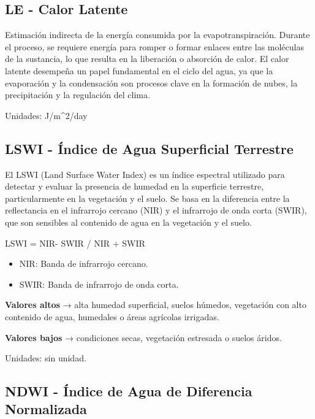 \documentclass[
]{book}
\begin{document}
\subsection{\texorpdfstring{\textbf{LE} - Calor Latente}{LE - Calor Latente}}\label{le---calor-latente-1}

Estimación indirecta de la energía consumida por la evapotranspiración. Durante el proceso, se requiere energía para romper o formar enlaces entre las moléculas de la sustancia, lo que resulta en la liberación o absorción de calor. El calor latente desempeña un papel fundamental en el ciclo del agua, ya que la evaporación y la condensación son procesos clave en la formación de nubes, la precipitación y la regulación del clima.

Unidades: J/m\^{}2/day

\subsection{\texorpdfstring{\textbf{LSWI} - Índice de Agua Superficial Terrestre}{LSWI - Índice de Agua Superficial Terrestre}}\label{lswi---uxedndice-de-agua-superficial-terrestre-1}

El LSWI (Land Surface Water Index) es un índice espectral utilizado para detectar y evaluar la presencia de humedad en la superficie terrestre, particularmente en la vegetación y el suelo. Se basa en la diferencia entre la reflectancia en el infrarrojo cercano (NIR) y el infrarrojo de onda corta (SWIR), que son sensibles al contenido de agua en la vegetación y el suelo.

LSWI = NIR- SWIR / NIR + SWIR\hspace{0pt}

\begin{itemize}
\item
  NIR: Banda de infrarrojo cercano.
\item
  SWIR: Banda de infrarrojo de onda corta.
\end{itemize}

\textbf{Valores altos} → alta humedad superficial, suelos húmedos, vegetación con alto contenido de agua, humedales o áreas agrícolas irrigadas.

\textbf{Valores bajos} → condiciones secas, vegetación estresada o suelos áridos.

Unidades: sin unidad.

\subsection{\texorpdfstring{\textbf{NDWI} - Índice de Agua de Diferencia Normalizada}{NDWI - Índice de Agua de Diferencia Normalizada}}\label{ndwi---uxedndice-de-agua-de-diferencia-normalizada-1}
\end{document}
